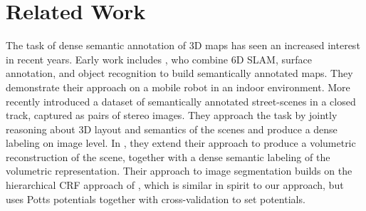 \section{Related Work}
The task of dense semantic annotation of 3D maps has seen an increased interest
in recent years.  Early work includes \citet{nuchter2008towards}, who combine
6D SLAM, surface annotation, and object recognition to build semantically
annotated maps. They demonstrate their approach on a mobile robot in an indoor
environment.
%
More recently \citet{sengupta2012automatic} introduced a dataset of
semantically annotated street-scenes in a closed track, captured as pairs of
stereo images. They approach the task by jointly reasoning about 3D layout and
semantics of the scenes and produce a dense labeling on image level.  In
\citet{senguptaurban}, they extend their approach to produce a volumetric
reconstruction of the scene, together with a dense semantic labeling of the
volumetric representation. Their approach to image segmentation builds on
the hierarchical CRF approach of
\citet{ladicky2009associative}, which is similar in spirit to our approach,
but uses Potts potentials together with cross-validation to set potentials.

